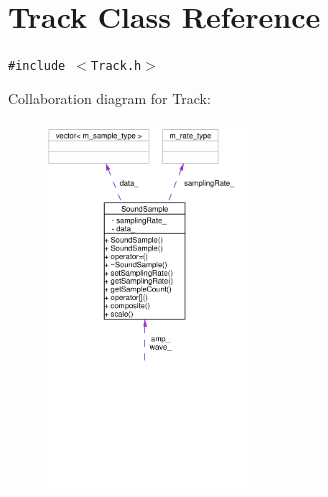\hypertarget{classTrack}{
\section{Track Class Reference}
\label{classTrack}
}
{\tt \#include $<$Track.h$>$}

Collaboration diagram for Track:\begin{figure}[H]
\begin{center}
\leavevmode
\includegraphics[width=155pt]{classTrack__coll__graph}
\end{center}
\end{figure}
